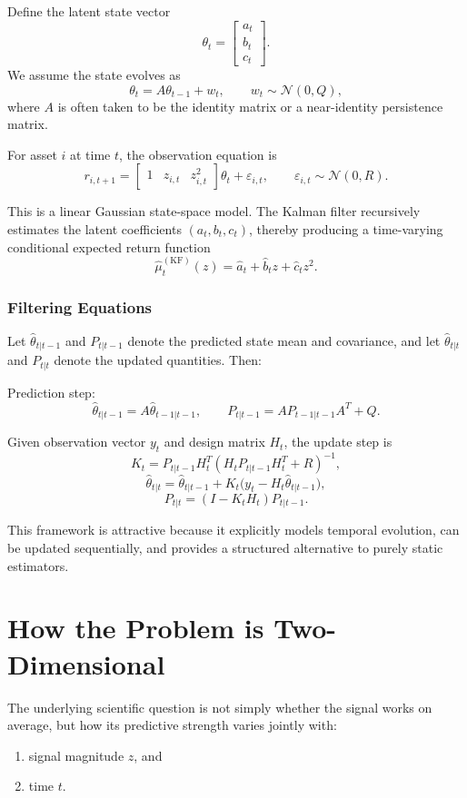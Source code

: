 \documentclass[11pt]{article}
\begin{document}
Define the latent state vector
\[
\theta_t =
\begin{bmatrix}
a_t\\ b_t\\ c_t
\end{bmatrix}.
\]
We assume the state evolves as
\[
\theta_t = A\theta_{t-1} + w_t,
\qquad
w_t\sim \mathcal{N}(0,Q),
\]
where $A$ is often taken to be the identity matrix or a near-identity persistence matrix.

For asset $i$ at time $t$, the observation equation is
\[
r_{i,t+1} = 
\begin{bmatrix}
1 & z_{i,t} & z_{i,t}^2
\end{bmatrix}
\theta_t + \varepsilon_{i,t},
\qquad
\varepsilon_{i,t}\sim \mathcal{N}(0,R).
\]

This is a linear Gaussian state-space model. The Kalman filter recursively estimates the latent coefficients $(a_t,b_t,c_t)$, thereby producing a time-varying conditional expected return function
\[
\widehat{\mu}_t^{(\mathrm{KF})}(z)
=
\widehat{a}_t + \widehat{b}_t z + \widehat{c}_t z^2.
\]

\subsubsection*{Filtering Equations}

Let $\widehat{\theta}_{t|t-1}$ and $P_{t|t-1}$ denote the predicted state mean and covariance, and let $\widehat{\theta}_{t|t}$ and $P_{t|t}$ denote the updated quantities. Then:

Prediction step:
\[
\widehat{\theta}_{t|t-1} = A\widehat{\theta}_{t-1|t-1},
\qquad
P_{t|t-1} = AP_{t-1|t-1}A^T + Q.
\]

Given observation vector $y_t$ and design matrix $H_t$, the update step is
\[
K_t = P_{t|t-1}H_t^T(H_tP_{t|t-1}H_t^T + R)^{-1},
\]
\[
\widehat{\theta}_{t|t} = \widehat{\theta}_{t|t-1} + K_t\big(y_t - H_t\widehat{\theta}_{t|t-1}\big),
\]
\[
P_{t|t} = (I-K_tH_t)P_{t|t-1}.
\]

This framework is attractive because it explicitly models temporal evolution, can be updated sequentially, and provides a structured alternative to purely static estimators.

\section{How the Problem is Two-Dimensional}

The underlying scientific question is not simply whether the signal works on average, but how its predictive strength varies jointly with:
\begin{enumerate}[label=(\alph*)]
    \item signal magnitude $z$, and
    \item time $t$.
\end{enumerate}
\end{document}
